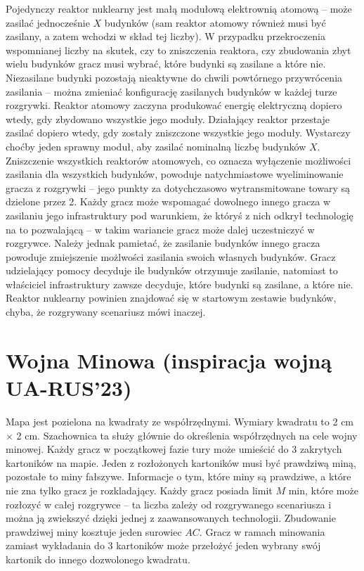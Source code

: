 \documentclass[11pt,a4paper]{article}
\begin{document}
Pojedynczy reaktor nuklearny jest małą modułową elektrownią atomową -- może zasilać jednocześnie $X$ budynków (sam reaktor atomowy również musi być zasilany, a zatem wchodzi w skład tej liczby). W przypadku przekroczenia wspomnianej liczby na skutek, czy to zniszczenia reaktora, czy zbudowania zbyt wielu budynków gracz musi wybrać, które budynki są zasilane a które nie. Niezasilane budynki pozostają nieaktywne do chwili powtórnego przywrócenia zasilania -- można zmieniać konfigurację zasilanych budynków w każdej turze rozgrywki. Reaktor atomowy zaczyna produkować energię elektryczną dopiero wtedy, gdy zbydowano wszystkie jego moduły. Działający reaktor przestaje zasilać dopiero wtedy, gdy zostały zniszczone wszystkie jego moduły. Wystarczy choćby jeden sprawny moduł, aby zasilać nominalną liczbę budynków $X$. Zniszczenie wszystkich reaktorów atomowych, co oznacza wyłączenie możliwości zasilania dla wszystkich budynków, powoduje natychmiastowe wyeliminowanie gracza z rozgrywki -- jego punkty za dotychczasowo wytransmitowane towary są dzielone przez 2. Każdy gracz może wspomagać dowolnego innego gracza w zasilaniu jego infrastruktury pod warunkiem, że któryś z nich odkrył technologię na to pozwalającą -- w takim wariancie gracz może dalej uczestniczyć w rozgrywce. Należy jednak pamietać, że zasilanie budynków innego gracza powoduje zmiejszenie możlwości zasilania swoich własnych budynków. Gracz udzielający pomocy decyduje ile budynków otrzymuje zasilanie, natomiast to właściciel infrastruktury zawsze decyduje, które budynki są zasilane, a które nie. Reaktor nuklearny powinien znajdować się w startowym zestawie budynków, chyba, że rozgrywany scenariusz mówi inaczej.

\section{Wojna Minowa (inspiracja wojną UA-RUS'23)}

Mapa jest pozielona na kwadraty ze współrzędnymi. Wymiary kwadratu to 2 cm $\times$ 2 cm. Szachownica ta służy głównie do określenia współrzędnych na cele wojny minowej. Każdy gracz w początkowej fazie tury może umieścić do 3 zakrytych kartoników na mapie. Jeden z rozłożonych kartoników musi być prawdziwą miną, pozostałe to miny fałszywe. Informacje o tym, które miny są prawdziwe, a które nie zna tylko gracz je rozkladający. Każdy gracz posiada limit $M$ min, które może rozłozyć w całej rozgrywce -- ta liczba zależy od rozgrywanego scenariusza i można ją zwiekszyć dzięki jednej z zaawansowanych technologii. Zbudowanie prawdziwej miny kosztuje jeden surowiec $AC$. Gracz w ramach minowania zamiast wykładania do 3 kartoników może przełożyć jeden wybrany swój kartonik do innego dozwolonego kwadratu.
\end{document}

